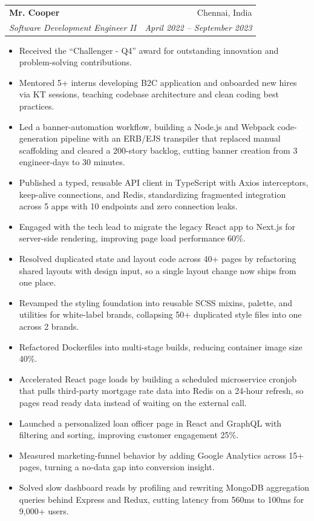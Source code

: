 \documentclass[letterpaper,11pt]{article}
\makeatletter
\newcommand{\resumeItem}[1]{
  \item\small{
    {#1 \vspace{-2pt}}
  }
}
\newcommand{\resumeSubheading}[4]{
  \vspace{-2pt}\item
    \begin{tabular*}{0.97\textwidth}[t]{l@{\extracolsep{\fill}}r}
      \textbf{#1} & #2 \\
      \textit{\small#3} & \textit{\small #4} \\
    \end{tabular*}\vspace{-7pt}
}
\newcommand{\resumeItemListStart}{\begin{itemize}}
\newcommand{\resumeItemListEnd}{\end{itemize}\vspace{-5pt}}
\makeatother
\begin{document}
    \resumeSubheading
      {Mr. Cooper}{Chennai, India}
      {Software Development Engineer II}{April 2022 -- September 2023}
      \resumeItemListStart
        \resumeItem{Received the  “Challenger - Q4” award for outstanding innovation and problem-solving contributions.}
        \resumeItem{Mentored 5+ interns developing B2C application and onboarded new hires via KT sessions, teaching codebase architecture and clean coding best practices.}
        \resumeItem{Led a banner-automation workflow, building a Node.js and Webpack code-generation pipeline with an ERB/EJS transpiler that replaced manual scaffolding and cleared a 200-story backlog, cutting banner creation from 3 engineer-days to 30 minutes.}
        \resumeItem{Published a typed, reusable API client in TypeScript with Axios interceptors, keep-alive connections, and Redis, standardizing fragmented integration across 5 apps with 10 endpoints and zero connection leaks.}
        \resumeItem{Engaged with the tech lead to migrate the legacy React app to Next.js for server-side rendering, improving page load performance 60\%.}
        \resumeItem{Resolved duplicated state and layout code across 40+ pages by refactoring shared layouts with design input, so a single layout change now ships from one place.}
        \resumeItem{Revamped the styling foundation into reusable SCSS mixins, palette, and utilities for white-label brands, collapsing 50+ duplicated style files into one across 2 brands.}
        \resumeItem{Refactored Dockerfiles into multi-stage builds, reducing container image size 40\%.}
        \resumeItem{Accelerated React page loads by building a scheduled microservice cronjob that pulls third-party mortgage rate data into Redis on a 24-hour refresh, so pages read ready data instead of waiting on the external call.}
        \resumeItem{Launched a personalized loan officer page in React and GraphQL with filtering and sorting, improving customer engagement 25\%.}
        \resumeItem{Measured marketing-funnel behavior by adding Google Analytics across 15+ pages, turning a no-data gap into conversion insight.}
        \resumeItem{Solved slow dashboard reads by profiling and rewriting MongoDB aggregation queries behind Express and Redux, cutting latency from 560ms to 100ms for 9,000+ users.}
      \resumeItemListEnd
\end{document}

